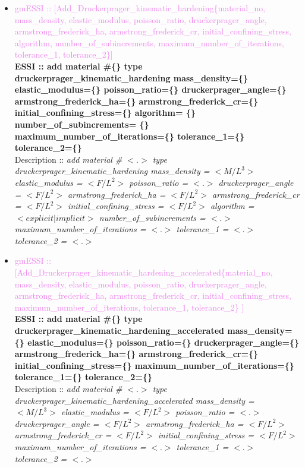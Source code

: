 \documentclass[11pt]{article}
\begin{document}
\begin{itemize}
      \item \textcolor{violet}{gmESSI :: [Add\_Druckerprager\_kinematic\_hardening\{material\_no, mass\_density, elastic\_modulus, poisson\_ratio, druckerprager\_angle, armstrong\_frederick\_ha, armstrong\_frederick\_cr, initial\_confining\_stress, algorithm, number\_of\_subincrements, maximum\_number\_of\_iterations, tolerance\_1, tolerance\_2\}]}\\
      \textbf{ESSI :: add material \#\{\} type druckerprager\_kinematic\_hardening mass\_density=\{\} elastic\_modulus=\{\}  poisson\_ratio=\{\} druckerprager\_angle=\{\} armstrong\_frederick\_ha=\{\} armstrong\_frederick\_cr=\{\} initial\_confining\_stress=\{\} algorithm= \{\}  number\_of\_subincrements= \{\} maximum\_number\_of\_iterations=\{\} tolerance\_1=\{\} tolerance\_2=\{\} }\\
      Description ::  \textit{ add material \# $<.>$ type druckerprager\_kinematic\_hardening  mass\_density = $<M/L^3>$ elastic\_modulus = $<F/L^2>$  poisson\_ratio = $<.>$ druckerprager\_angle = $<F/L^2>$ armstrong\_frederick\_ha = $<F/L^2>$ armstrong\_frederick\_cr = $<F/L^2>$ initial\_confining\_stress = $<F/L^2>$ algorithm = $<explicit|implicit>$  number\_of\_subincrements = $<.>$ maximum\_number\_of\_iterations = $<.>$ tolerance\_1 = $<.>$ tolerance\_2 = $<.>$} 

      \item \textcolor{violet}{gmESSI :: [Add\_Druckerprager\_kinematic\_hardening\_accelerated\{material\_no, mass\_density, elastic\_modulus, poisson\_ratio, druckerprager\_angle, armstrong\_frederick\_ha, armstrong\_frederick\_cr, initial\_confining\_stress, maximum\_number\_of\_iterations, tolerance\_1, tolerance\_2\} ]}\\
      \textbf{ESSI :: add material \#\{\} type druckerprager\_kinematic\_hardening\_accelerated mass\_density=\{\} elastic\_modulus=\{\}  poisson\_ratio=\{\} druckerprager\_angle=\{\} armstrong\_frederick\_ha=\{\} armstrong\_frederick\_cr=\{\} initial\_confining\_stress=\{\} maximum\_number\_of\_iterations=\{\} tolerance\_1=\{\} tolerance\_2=\{\} }\\
      Description ::  \textit{ add material \# $<.>$ type druckerprager\_kinematic\_hardening\_accelerated  mass\_density = $<M/L^3>$ elastic\_modulus = $<F/L^2>$  poisson\_ratio = $<.>$ druckerprager\_angle = $<F/L^2>$ armstrong\_frederick\_ha = $<F/L^2>$ armstrong\_frederick\_cr = $<F/L^2>$ initial\_confining\_stress = $<F/L^2>$ maximum\_number\_of\_iterations = $<.>$ tolerance\_1 = $<.>$ tolerance\_2 = $<.>$} 


\end{itemize}
\end{document}
